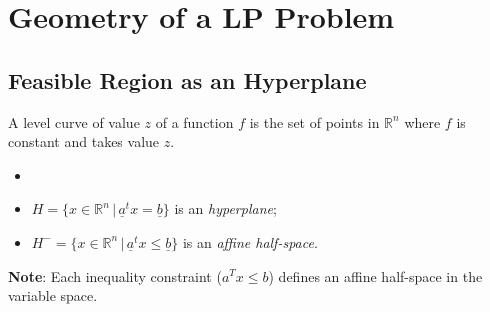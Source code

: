     \section{Geometry of a LP Problem}
        \subsection{Feasible Region as an Hyperplane}
            \begin{definition}
                A level curve of value $z$ of a function $f$ is the set of points in $\mathbb{R}^n$ where $f$ is constant and takes value $z$.
            \end{definition}
            
            \begin{definition}[Hyperplane]
                \begin{itemize}
                    \item[]
                    \item[] $ H = \{x \in \mathbb{R}^n \,\vert\, \underline{a}^tx = \underline{b}\}$ is an \emph{hyperplane};
                    \item[] $H^- = \{x \in \mathbb{R}^n \,\vert\, \underline{a}^tx \leq \underline{b}\}$ is an \emph{affine half-space}.
                \end{itemize}
           \end{definition}
           \textbf{Note}: Each inequality constraint ($a^Tx \leq b$) defines an affine half-space in the variable space.\\

